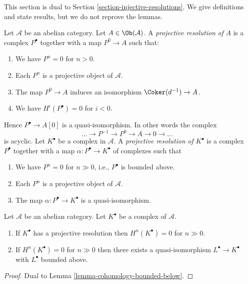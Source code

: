 \noindent
This section is dual to
Section \ref{section-injective-resolutions}.
We give definitions and state results, but we do not reprove the lemmas.

\begin{definition}
\label{definition-projective-resolution}
Let $\mathcal{A}$ be an abelian category.
Let $A \in \Ob(\mathcal{A})$.
A {\it projective resolution of $A$} is a complex
$P^\bullet$ together with a map $P^0 \to A$ such
that:
\begin{enumerate}
\item We have $P^n = 0$ for $n > 0$.
\item Each $P^n$ is a projective object of $\mathcal{A}$.
\item The map $P^0 \to A$ induces an isomorphism $\Coker(d^{-1}) \to A$.
\item We have $H^i(P^\bullet) = 0$ for $i < 0$.
\end{enumerate}
Hence $P^\bullet \to A[0]$ is a quasi-isomorphism.
In other words the complex
$$
\ldots \to P^{-1} \to P^0 \to A \to 0 \to \ldots
$$
is acyclic. Let $K^\bullet$ be a complex in $\mathcal{A}$.
A {\it projective resolution of $K^\bullet$} is a complex
$P^\bullet$ together with a map $\alpha : P^\bullet \to K^\bullet$
of complexes such that
\begin{enumerate}
\item We have $P^n = 0$ for $n \gg 0$, i.e., $P^\bullet$ is bounded above.
\item Each $P^n$ is a projective object of $\mathcal{A}$.
\item The map $\alpha : P^\bullet \to K^\bullet$ is a
quasi-isomorphism.
\end{enumerate}
\end{definition}

\begin{lemma}
\label{lemma-cohomology-bounded-above}
Let $\mathcal{A}$ be an abelian category.
Let $K^\bullet$ be a complex of $\mathcal{A}$.
\begin{enumerate}
\item If $K^\bullet$ has a projective resolution then
$H^n(K^\bullet) = 0$ for $n \gg 0$.
\item If $H^n(K^\bullet) = 0$ for $n \gg 0$ then there
exists a quasi-isomorphism $L^\bullet \to K^\bullet$
with $L^\bullet$ bounded above.
\end{enumerate}
\end{lemma}

\begin{proof}
Dual to
Lemma \ref{lemma-cohomology-bounded-below}.
\end{proof}

